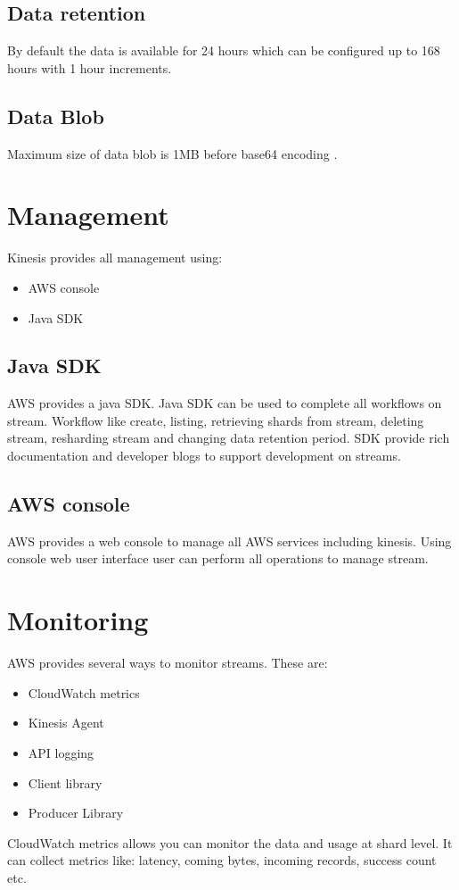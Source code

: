 \documentclass[9pt,twocolumn,twoside]{../../styles/osajnl}
\begin{document}
\subsection{Data retention}
By default the data is available for 24 hours which can be configured up to 168
hours with 1 hour increments.

\subsection{Data Blob}
Maximum size of data blob is 1MB before base64 encoding \CE.

\section{Management}
Kinesis provides all management using:
\begin{itemize}
	\item  AWS console
	\item Java SDK \cite{www-kinesis-javasdk}
\end{itemize}
\subsection{Java SDK}
AWS provides a java SDK. Java SDK \cite{www-kinesis-javasdk} can be used to
complete all workflows on stream. Workflow like create, listing, retrieving
shards from stream, deleting stream, resharding stream and changing data
retention period. SDK provide rich documentation and developer blogs to support
development on streams.

\subsection{AWS console}
AWS provides a web console to manage all AWS services including kinesis.  Using
console web user interface user can perform all operations to manage stream.

\section{Monitoring}
AWS provides several ways to monitor streams. These are:
\begin{itemize}
	\item CloudWatch metrics
	\item Kinesis Agent
	\item API logging
	\item Client library
	\item Producer Library
\end{itemize}
CloudWatch metrics allows you can monitor the data and usage at shard level. \GE
 It
can collect metrics like: latency, coming bytes, incoming records, success count
etc.
\end{document}
